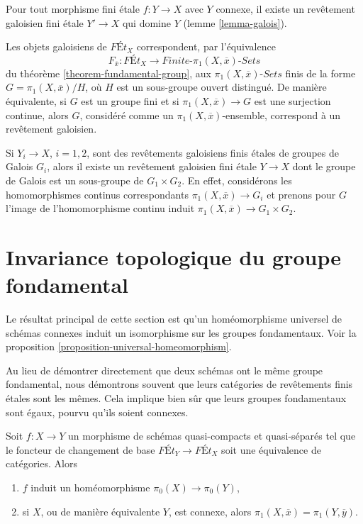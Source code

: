 \medskip\noindent
Pour tout morphisme fini étale $f : Y \to X$ avec $Y$ connexe,
il existe un revêtement galoisien fini étale $Y' \to X$ qui domine $Y$
(lemme \ref{lemma-galois}).

\medskip\noindent
Les objets galoisiens de $\textit{F\'Et}_X$ correspondent, par l'équivalence
$$
F_{\overline{x}} : \textit{F\'Et}_X \to
\textit{Finite-}\pi_1(X, \overline{x})\textit{-Sets}
$$
du théorème \ref{theorem-fundamental-group},
aux $\pi_1(X, \overline{x})\textit{-Sets}$ finis
de la forme $G = \pi_1(X, \overline{x})/H$, où $H$ est un
sous-groupe ouvert distingué. De manière équivalente, si $G$ est un groupe fini
et si $\pi_1(X, \overline{x}) \to G$ est une surjection continue,
alors $G$, considéré comme un $\pi_1(X, \overline{x})$-ensemble, correspond
à un revêtement galoisien.

\medskip\noindent
Si $Y_i \to X$, $i = 1, 2$, sont des revêtements galoisiens finis étales
de groupes de Galois $G_i$, alors il existe un revêtement galoisien
fini étale $Y \to X$ dont le groupe de Galois est un sous-groupe de
$G_1 \times G_2$. En effet, considérons les homomorphismes continus
correspondants $\pi_1(X, \overline{x}) \to G_i$ et
prenons pour $G$ l'image de l'homomorphisme continu induit
$\pi_1(X, \overline{x}) \to G_1 \times G_2$.









\section{Invariance topologique du groupe fondamental}
\label{section-topological-invariance}

\noindent
Le résultat principal de cette section est qu'un homéomorphisme universel
de schémas connexes induit un isomorphisme sur les groupes fondamentaux.
Voir la proposition \ref{proposition-universal-homeomorphism}.

\medskip\noindent
Au lieu de démontrer directement que deux schémas ont le même groupe
fondamental, nous démontrons souvent que leurs catégories de revêtements
finis étales sont les mêmes. Cela implique bien sûr que
leurs groupes fondamentaux sont égaux, pourvu qu'ils soient connexes.

\begin{lemma}
\label{lemma-what-equivalence-gives}
Soit $f : X \to Y$ un morphisme de schémas quasi-compacts et quasi-séparés
tel que le foncteur de changement de base $\textit{F\'Et}_Y \to \textit{F\'Et}_X$
soit une équivalence de catégories. Alors
\begin{enumerate}
\item $f$ induit un homéomorphisme $\pi_0(X) \to \pi_0(Y)$,
\item si $X$, ou de manière équivalente $Y$, est connexe, alors
$\pi_1(X, \overline{x}) = \pi_1(Y, \overline{y})$.
\end{enumerate}
\end{lemma}

